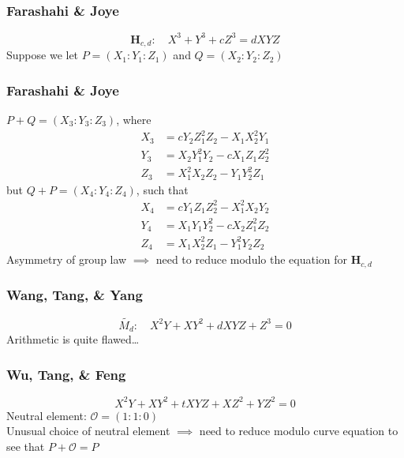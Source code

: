 \documentclass[xcolor=dvipsnames, handout]{beamer}
\begin{document}
\begin{frame}
    \frametitle{Farashahi \& Joye}
    \begin{displaymath}
    \mathbf{H}_{c, d}:\quad X^3 + Y^3 + cZ^3 = dXYZ
    \end{displaymath}
    Suppose we let $P = (X_1 : Y_1 : Z_1)$ and $Q = (X_2 : Y_2 : Z_2)$
\end{frame}

\begin{frame}
    \frametitle{Farashahi \& Joye}
    $P + Q = (X_3 : Y_3 : Z_3)$, where
    \begin{align*}
        X_3 &=  cY_2Z_1^2Z_2 - X_1X_2^2Y_1\\
        Y_3 &=  X_2Y_1^2Y_2 - cX_1Z_1Z_2^2\\
        Z_3 &=  X_1^2X_2Z_2 - Y_1Y_2^2Z_1
    \end{align*}
    \pause
    but $Q + P = (X_4 : Y_4 : Z_4)$, such that
    \begin{align*}
        X_4 &=  cY_1Z_1Z_2^2 - X_1^2X_2Y_2\\
        Y_4 &=  X_1Y_1Y_2^2 - cX_2Z_1^2Z_2\\
        Z_4 &=  X_1X_2^2Z_1 - Y_1^2Y_2Z_2
    \end{align*}
    \pause
    \alert{Asymmetry of group law $\implies$ need to reduce modulo the equation
        for $\mathbf{H}_{c, d}$}
\end{frame}

\begin{frame}
    \frametitle{Wang, Tang, \& Yang}
    \begin{displaymath}
        \widetilde{M_d}:\quad X^2Y + XY^2 + dXYZ + Z^3 = 0
    \end{displaymath}
    \pause
    \alert{Arithmetic is quite flawed\dots}
\end{frame}

\begin{frame}
    \frametitle{Wu, Tang, \& Feng}
    \begin{displaymath}
        X^2Y + XY^2 + tXYZ + XZ^2 + YZ^2 = 0
    \end{displaymath}
    Neutral element: $\mathcal{O} = (1 : 1 : 0)$\\
    \pause
    \alert{Unusual choice of neutral element $\implies$ need to reduce modulo
        curve equation to see that $P + \mathcal{O} = P$}
\end{frame}
\end{document}
